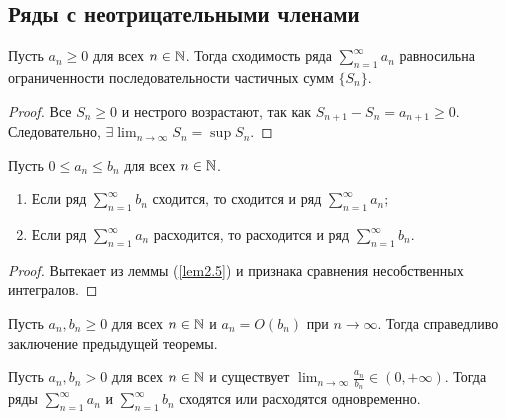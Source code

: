 
\subsection{Ряды с неотрицательными членами}

\begin{lemma}
    Пусть $a_n \ge 0$ для всех $n \in \mathbb{N}$. Тогда сходимость ряда $\sum_{n = 1}^{\infty} a_n$ равносильна ограниченности последовательности частичных сумм $\{S_n\}$.

    \begin{proof}
        Все $S_n \ge 0$ и нестрого возрастают, так как $S_{n + 1} - S_n = a_{n + 1} \ge 0$. Следовательно, $\exists \lim_{n \rightarrow \infty} S_n = \sup S_n.$
    \end{proof}
\end{lemma}

\begin{theorem}
    Пусть $0 \le a_n \le b_n$ для всех $n \in \mathbb{N}$.
    \begin{enumerate}
        \item Если ряд $\sum_{n = 1}^\infty b_n$ сходится, то сходится и ряд $\sum_{n = 1}^\infty a_n$;
        \item Если ряд $\sum_{n = 1}^\infty a_n$ расходится, то расходится и ряд $\sum_{n = 1}^\infty b_n$.
    \end{enumerate}

    \begin{proof}
        Вытекает из леммы (\ref{lem2.5}) и признака сравнения несобственных интегралов.
    \end{proof}
\end{theorem}

\begin{corollary}
    Пусть $a_n, b_n \ge 0$ для всех $n \in \mathbb{N}$ и $a_n = O(b_n)$ при $n \rightarrow \infty$. Тогда справедливо заключение предыдущей теоремы.
\end{corollary}

\begin{corollary}
    Пусть $a_n, b_n > 0$ для всех $n \in \mathbb{N}$ и существует $\lim_{n \rightarrow \infty} \frac{a_n}{b_n} \in (0, +\infty)$. Тогда ряды $\sum_{n = 1}^\infty a_n$ и $\sum_{n = 1}^\infty b_n$ сходятся или расходятся одновременно.
\end{corollary}

